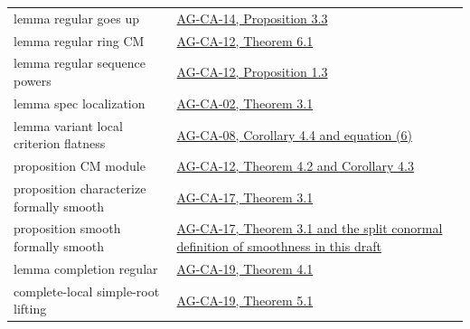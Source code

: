 \documentclass[11pt,a4paper,openany]{report}
\begin{document}
{\begin{longtable}[]{@{}
  >{\raggedright\arraybackslash}p{}
  >{\raggedright\arraybackslash}p{}@{}}
lemma regular goes up & \href{https://github.com/KokunoYumeto/open-math-courses/blob/d02d0a3669f42579db037cd44de1d113fdd770a1/docs/courses/AG-CA/src/regular-local-rings.md}{AG-CA-14, Proposition 3.3} \\
lemma regular ring CM & \href{https://github.com/KokunoYumeto/open-math-courses/blob/d02d0a3669f42579db037cd44de1d113fdd770a1/docs/courses/AG-CA/src/regular-sequences-depth-and-cohen-macaulay-modules.md}{AG-CA-12, Theorem 6.1} \\
lemma regular sequence powers & \href{https://github.com/KokunoYumeto/open-math-courses/blob/d02d0a3669f42579db037cd44de1d113fdd770a1/docs/courses/AG-CA/src/regular-sequences-depth-and-cohen-macaulay-modules.md}{AG-CA-12, Proposition 1.3} \\
lemma spec localization & \href{https://github.com/KokunoYumeto/open-math-courses/blob/d02d0a3669f42579db037cd44de1d113fdd770a1/docs/courses/AG-CA/src/localization-local-properties-and-support.md}{AG-CA-02, Theorem 3.1} \\
lemma variant local criterion flatness & \href{https://github.com/KokunoYumeto/open-math-courses/blob/d02d0a3669f42579db037cd44de1d113fdd770a1/docs/courses/AG-CA/src/faithful-flatness-and-the-local-criterion-for-flatness.md}{AG-CA-08, Corollary 4.4 and equation (6)} \\
proposition CM module & \href{https://github.com/KokunoYumeto/open-math-courses/blob/d02d0a3669f42579db037cd44de1d113fdd770a1/docs/courses/AG-CA/src/regular-sequences-depth-and-cohen-macaulay-modules.md}{AG-CA-12, Theorem 4.2 and Corollary 4.3} \\
proposition characterize formally smooth & \href{https://github.com/KokunoYumeto/open-math-courses/blob/d02d0a3669f42579db037cd44de1d113fdd770a1/docs/courses/AG-CA/src/formally-smooth-unramified-and-etale-ring-maps.md}{AG-CA-17, Theorem 3.1} \\
proposition smooth formally smooth & \href{https://github.com/KokunoYumeto/open-math-courses/blob/d02d0a3669f42579db037cd44de1d113fdd770a1/docs/courses/AG-CA/src/formally-smooth-unramified-and-etale-ring-maps.md}{AG-CA-17, Theorem 3.1 and the split conormal definition of smoothness in this draft} \\
lemma completion regular & \href{https://github.com/KokunoYumeto/open-math-courses/blob/d02d0a3669f42579db037cd44de1d113fdd770a1/docs/courses/AG-CA/src/completion.md}{AG-CA-19, Theorem 4.1} \\
complete-local simple-root lifting & \href{https://github.com/KokunoYumeto/open-math-courses/blob/d02d0a3669f42579db037cd44de1d113fdd770a1/docs/courses/AG-CA/src/completion.md\#5-hensel-lifting-in-every-complete-local-ring}{AG-CA-19, Theorem 5.1} \\

\end{longtable}}
\end{document}

